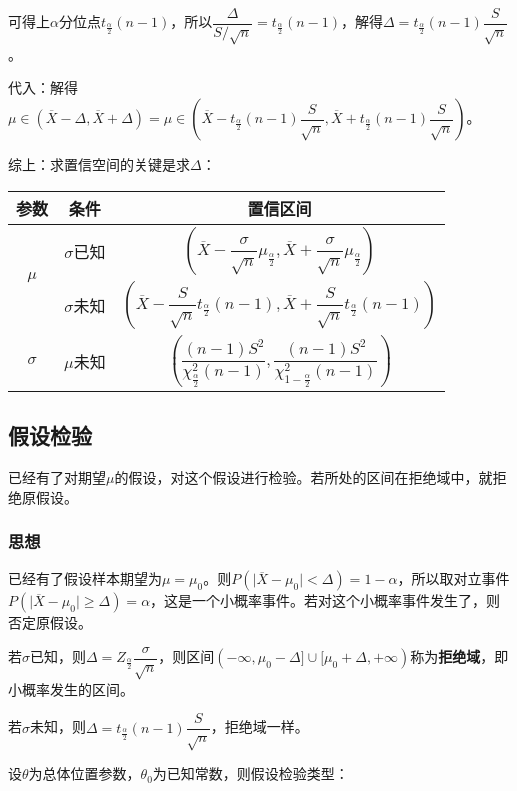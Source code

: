 \documentclass[UTF8, 12pt]{ctexart}
\begin{document}
可得上$\alpha$分位点$t_\frac{\alpha}{2}(n-1)$，所以$\dfrac{\Delta}{S/\sqrt{n}}=t_\frac{\alpha}{2}(n-1)$，解得$\Delta=t_\frac{\alpha}{2}(n-1)\dfrac{S}{\sqrt{n}}$。

代入：解得$\mu\in(\overline{X}-\Delta,\overline{X}+\Delta)=\mu\in(\overline{X}-t_\frac{\alpha}{2}(n-1)\dfrac{S}{\sqrt{n}},\overline{X}+t_\frac{\alpha}{2}(n-1)\dfrac{S}{\sqrt{n}})$。

综上：求置信空间的关键是求$\Delta$：\medskip

\begin{tabular}{|c|c|c|}
    \hline
    参数 & 条件 & 置信区间 \\ \hline
    \multirow{2}{*}{$\mu$} & $\sigma$已知 & $\left(\overline{X}-\dfrac{\sigma}{\sqrt{n}}\mu_{\frac{\alpha}{2}},\overline{X}+\dfrac{\sigma}{\sqrt{n}}\mu_{\frac{\alpha}{2}}\right)$ \\ \cline{2-3}
    & $\sigma$未知 & $\left(\overline{X}-\dfrac{S}{\sqrt{n}}t_{\frac{\alpha}{2}}(n-1),\overline{X}+\dfrac{S}{\sqrt{n}}t_{\frac{\alpha}{2}}(n-1)\right)$ \\ \hline
    $\sigma$ & $\mu$未知 &  $\left(\dfrac{(n-1)S^2}{\chi^2_{\frac{\alpha}{2}}(n-1)},\dfrac{(n-1)S^2}{\chi^2_{1-\frac{\alpha}{2}}(n-1)}\right)$ \\ \hline
\end{tabular}

\subsection{假设检验}

已经有了对期望$\mu$的假设，对这个假设进行检验。若所处的区间在拒绝域中，就拒绝原假设。

\subsubsection{思想}

已经有了假设样本期望为$\mu=\mu_0$。则$P(\vert\overline{X}-\mu_0\vert<\Delta)=1-\alpha$，所以取对立事件$P(\vert\overline{X}-\mu_0\vert\geqslant\Delta)=\alpha$，这是一个小概率事件。若对这个小概率事件发生了，则否定原假设。

若$\sigma$已知，则$\Delta=Z_\frac{\alpha}{2}\dfrac{\sigma}{\sqrt{n}}$，则区间$(-\infty,\mu_0-\Delta]\cup[\mu_0+\Delta,+\infty)$称为\textbf{拒绝域}，即小概率发生的区间。

若$\sigma$未知，则$\Delta=t_\frac{\alpha}{2}(n-1)\dfrac{S}{\sqrt{n}}$，拒绝域一样。

设$\theta$为总体位置参数，$\theta_0$为已知常数，则假设检验类型：\medskip
\end{document}
